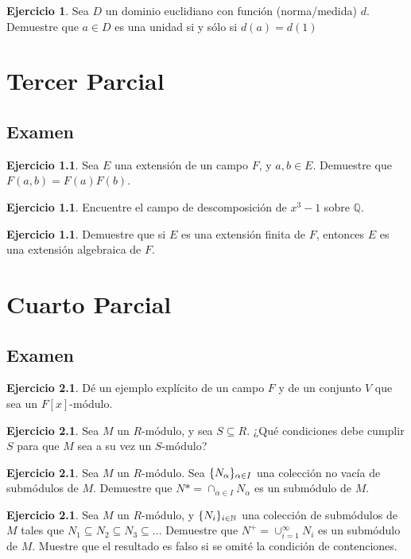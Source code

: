 \documentclass[11pt,a4paper,oneside]{report}
\theoremstyle{definition}
\newtheorem{ejercicio}[definicion]{Ejercicio}
\theoremstyle{plain}
\theoremstyle{remark}
\newcommand{\N}{\mathbb{N}}
\newcommand{\Q}{\mathbb{Q}}
\DeclarePairedDelimiter{\conj}{\{}{\}}
\begin{document}
\begin{ejercicio}
Sea $D$ un dominio euclidiano con función (norma/medida) $d$. Demuestre que $a\in D$ es una unidad si y sólo si
$d(a)=d(1)$
\end{ejercicio}

\chapter{Tercer Parcial}

\section{Examen}

\begin{ejercicio}
Sea $E$ una extensión de un campo $F$, y $a,b \in E$. Demuestre que $F(a,b)=F(a)F(b)$.
\end{ejercicio}

\begin{ejercicio}
Encuentre el campo de descomposición de $x^3-1$ sobre $\Q$.
\end{ejercicio}

\begin{ejercicio}
Demuestre que si $E$ es una extensión finita de $F$, entonces $E$ es una extensión algebraica de $F$.
\end{ejercicio}

\chapter{Cuarto Parcial}

\section{Examen}

\begin{ejercicio}
Dé un ejemplo explícito de un campo $F$ y de un conjunto $V$ que sea un $F[x]$-módulo.
\end{ejercicio}

\begin{ejercicio}
Sea $M$ un $R$-módulo, y sea $S\subseteq R$. ¿Qué condiciones debe cumplir $S$ para 
que $M$ sea a su vez un $S$-módulo? 
\end{ejercicio}

\begin{ejercicio}
Sea $M$ un $R$-módulo. Sea $\conj{N_\alpha}_{\alpha\in I}$ una colección no vacía de
submódulos de $M$. Demuestre que $N*=\cap_{\alpha \in I} N_\alpha$ es un submódulo de $M$.
\end{ejercicio}

\begin{ejercicio}
Sea $M$ un $R$-módulo, y $\conj{N_i}_{i\in \N}$ una colección de submódulos de $M$
tales que $N_1 \subseteq N_2 \subseteq N_3 \subseteq ...$ Demuestre que 
$N^{+}=\cup_{i=1}^{\infty}N_i$ es un submódulo de $M$. Muestre que el resultado es
falso si se omité la condición de contenciones.
\end{ejercicio}
\printindex
\end{document}
